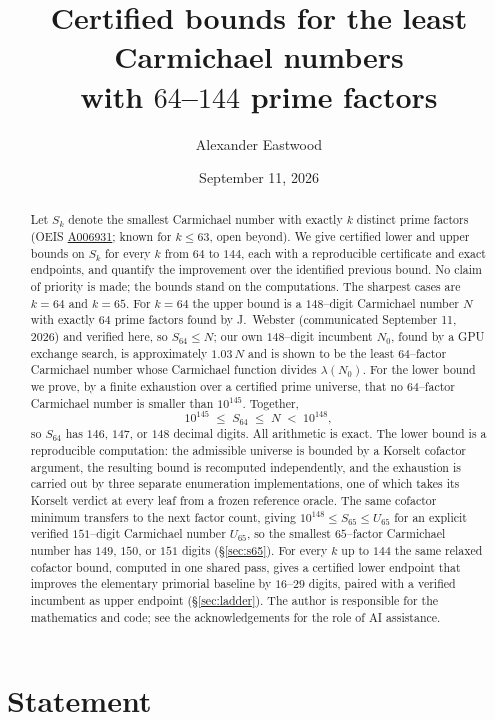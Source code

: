 \documentclass[11pt]{article}
\title{Certified bounds for the least Carmichael numbers\\ with $64$--$144$ prime factors}
\author{Alexander Eastwood}
\date{September 11, 2026}
\theoremstyle{definition}
\newcommand{\Smin}{S_{64}}
\begin{document}
\maketitle

\begin{abstract}
Let $S_k$ denote the smallest Carmichael number with exactly $k$ distinct prime factors (OEIS
\href{https://oeis.org/A006931}{A006931}; known for $k\le 63$, open beyond). We give certified lower
and upper bounds on $S_k$ for every $k$ from $64$ to $144$, each with a reproducible certificate and
exact endpoints, and quantify the improvement over the identified previous bound. No claim of priority
is made; the bounds stand on the computations. The sharpest cases are $k=64$ and $k=65$. For $k=64$ the
upper bound is a $148$--digit Carmichael number $N$ with exactly $64$ prime factors found by
J.~Webster (communicated September 11, 2026) and verified here, so $\Smin \le N$; our own
$148$--digit incumbent $N_0$, found by a GPU exchange search, is approximately $1.03\,N$ and is shown to be the
least $64$--factor Carmichael number whose Carmichael function divides $\lambda(N_0)$. For the lower bound we prove, by a finite
exhaustion over a certified prime universe, that no $64$--factor Carmichael number is smaller than
$10^{145}$. Together,
\[
  10^{145} \;\le\; \Smin \;\le\; N \;<\; 10^{148},
\]
so $\Smin$ has $146$, $147$, or $148$ decimal digits. All arithmetic is exact. The lower bound is
a reproducible computation: the admissible universe is bounded by a Korselt cofactor argument, the
resulting bound is recomputed independently, and the exhaustion is carried out by three separate
enumeration implementations, one of which takes its Korselt verdict at every leaf from a frozen
reference oracle. The same cofactor minimum transfers to the next factor count, giving
$10^{148}\le S_{65}\le U_{65}$ for an explicit verified $151$--digit Carmichael number $U_{65}$, so
the smallest $65$--factor Carmichael number has $149$, $150$, or $151$ digits (\S\ref{sec:s65}). For
every $k$ up to $144$ the same relaxed cofactor bound, computed in one shared pass, gives a certified
lower endpoint that improves the elementary primorial baseline by $16$--$29$ digits, paired with a
verified incumbent as upper endpoint (\S\ref{sec:ladder}). The author is responsible for the
mathematics and code; see the acknowledgements for the role of AI assistance.
\end{abstract}

\section{Statement}
\end{document}
